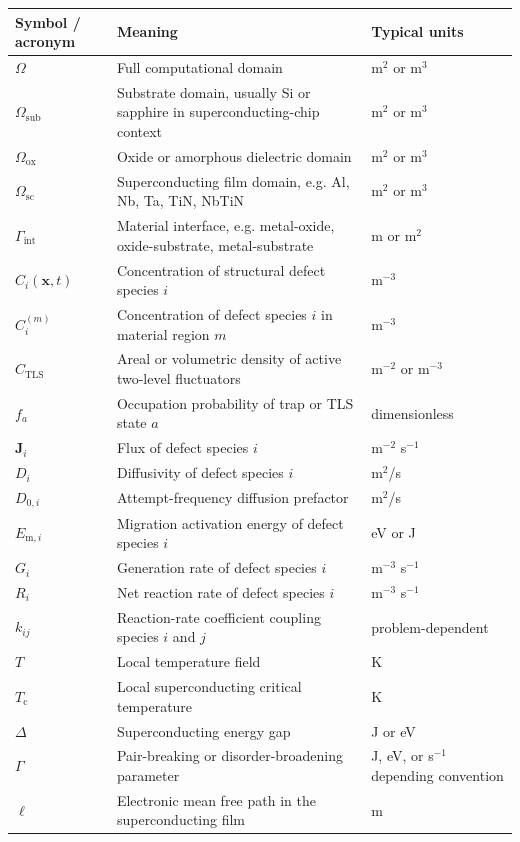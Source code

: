 \documentclass[11pt]{article}
\newcommand{\Om}{\Omega}
\newcommand{\Osub}{\Omega_{\mathrm{sub}}}
\newcommand{\Oox}{\Omega_{\mathrm{ox}}}
\newcommand{\Oint}{\Gamma_{\mathrm{int}}}
\newcommand{\Osc}{\Omega_{\mathrm{sc}}}
\newcommand{\Jdef}{\mathbf{J}}
\newcommand{\x}{\mathbf{x}}
\begin{document}
\renewcommand{\arraystretch}{1.22}
\begin{longtable}{p{} p{} p{}}
\toprule
\textbf{Symbol / acronym} & \textbf{Meaning} & \textbf{Typical units} \\
\midrule
\endhead
$\Om$ & Full computational domain & m$^2$ or m$^3$ \\
$\Osub$ & Substrate domain, usually Si or sapphire in superconducting-chip context & m$^2$ or m$^3$ \\
$\Oox$ & Oxide or amorphous dielectric domain & m$^2$ or m$^3$ \\
$\Osc$ & Superconducting film domain, e.g. Al, Nb, Ta, TiN, NbTiN & m$^2$ or m$^3$ \\
$\Oint$ & Material interface, e.g. metal-oxide, oxide-substrate, metal-substrate & m or m$^2$ \\
$C_i(\x,t)$ & Concentration of structural defect species $i$ & m$^{-3}$ \\
$C_i^{(m)}$ & Concentration of defect species $i$ in material region $m$ & m$^{-3}$ \\
$C_{\mathrm{TLS}}$ & Areal or volumetric density of active two-level fluctuators & m$^{-2}$ or m$^{-3}$ \\
$f_a$ & Occupation probability of trap or TLS state $a$ & dimensionless \\
$\Jdef_i$ & Flux of defect species $i$ & m$^{-2}$ s$^{-1}$ \\
$D_i$ & Diffusivity of defect species $i$ & m$^2$/s \\
$D_{0,i}$ & Attempt-frequency diffusion prefactor & m$^2$/s \\
$E_{\mathrm{m},i}$ & Migration activation energy of defect species $i$ & eV or J \\
$G_i$ & Generation rate of defect species $i$ & m$^{-3}$ s$^{-1}$ \\
$R_i$ & Net reaction rate of defect species $i$ & m$^{-3}$ s$^{-1}$ \\
$k_{ij}$ & Reaction-rate coefficient coupling species $i$ and $j$ & problem-dependent \\
$T$ & Local temperature field & K \\
$T_{\mathrm{c}}$ & Local superconducting critical temperature & K \\
$\Delta$ & Superconducting energy gap & J or eV \\
$\Gamma$ & Pair-breaking or disorder-broadening parameter & J, eV, or s$^{-1}$ depending convention \\
$\ell$ & Electronic mean free path in the superconducting film & m \\

\end{longtable}
\end{document}
